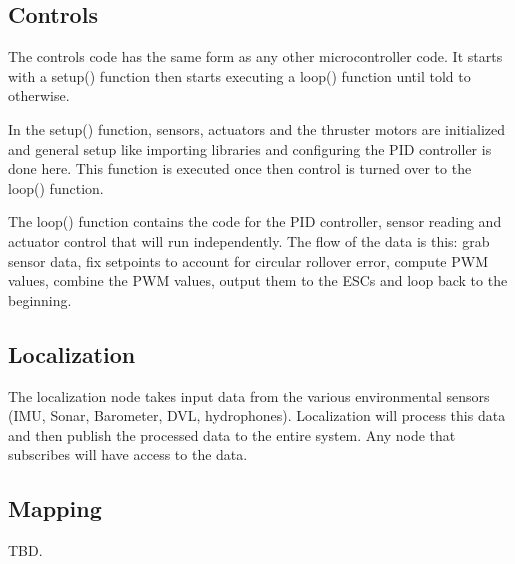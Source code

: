\subsection{Controls}
\label{sec:controls}

The controls code has the same form as any other microcontroller code. It
starts with a setup() function then starts executing a loop() function until
told to otherwise. 
\par

In the setup() function, sensors, actuators and the thruster motors are
initialized and general setup like importing libraries and configuring the PID
controller is done here. This function is executed once then control is turned
over to the loop() function. 
\par

The loop() function contains the code for the PID controller, sensor reading
and actuator control that will run independently. The flow of the data is this:
grab sensor data, fix setpoints to account for circular rollover error, compute
PWM values, combine the PWM values, output them to the ESCs and loop back to
the beginning.
\par

\subsection{Localization}
\label{sec:localization}

The localization node takes input data from the various environmental sensors
(IMU, Sonar, Barometer, DVL, hydrophones). Localization will process this data
and then publish the processed data to the entire system. Any node that
subscribes will have access to the data.
\par

\subsection{Mapping}
\label{sec:mapping}

TBD.
\par

